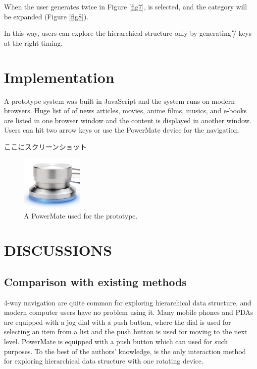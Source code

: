 \documentclass{article}
\begin{document}
When the user generates {\D} twice in Figure \ref{fig7},
 is selected, and the category will be expanded (Figure \ref{fig8}).

In this way, users can explore the hierarchical structure
only by generating {\U}/{\D} keys at the right timing.

\section*{Implementation}

A prototype system was built in JavaScript and the system runs on modern browsers.
Huge list of of news articles, movies, anime films, musics, and e-books are listed in one browser window
and the content is displayed in another window.
Users can hit two arrow keys or use the PowerMate device for the navigation.

ここにスクリーンショット

\begin{figure}[H]
\centerline{\includegraphics[width=30mm,bb=0 0 389 348]{figures/d3a69499f7e7314ae6dc10f5bf3a2be5.png}}
\caption{A PowerMate used for the prototype.}
\label{powermate}
\end{figure}

\section*{DISCUSSIONS}

\subsection{Comparison with existing methods}

4-way navigation are quite common for exploring hierarchical data structure,
and modern computer users have no problem using it.
Many mobile phones and PDAs are equipped with a jog dial with a push button,
where the dial is used for selecting an item from a list and 
the push button is used for moving to the next level.
PowerMate is equipped with a push button which can used for such purposes.
To the best of the authors' knowledge,
{\ST} is the only interaction method for exploring hierarchical data structure
with one rotating device.
\end{document}
